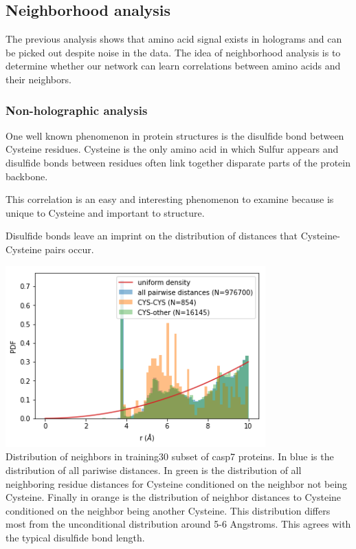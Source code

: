 \documentclass{article}
\begin{document}
\subsection{Neighborhood analysis}

The previous analysis shows that amino acid signal exists in holograms and can be picked out despite noise in the data. The idea of neighborhood analysis is to determine whether our network can learn correlations between amino acids and their neighbors. 

\subsubsection{Non-holographic analysis}

One well known phenomenon in protein structures is the disulfide bond between Cysteine residues. Cysteine is the only amino acid in which Sulfur appears and disulfide bonds between residues often link together disparate parts of the protein backbone. 

This correlation is an easy and interesting phenomenon to examine because is unique to Cysteine and important to structure. 

Disulfide bonds leave an imprint on the distribution of distances that Cysteine-Cysteine pairs occur.
\begin{center}
    \includegraphics[width=10cm]{CYS-CYS.png}\\
    Distribution of neighbors in training30 subset of casp7 proteins. In blue is the distribution of all pariwise distances. In green is the distribution of all neighboring residue distances for Cysteine conditioned on the neighbor not being Cysteine. Finally in orange is the distribution of neighbor distances to Cysteine conditioned on the neighbor being another Cysteine. This distribution differs most from the unconditional distribution around 5-6 Angstroms. This agrees with the typical disulfide bond length.
\end{center}
\end{document}
